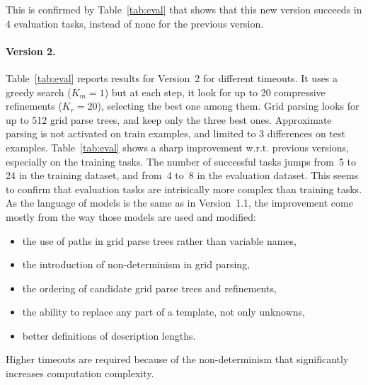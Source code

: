 \documentclass[a4paper]{llncs}
\begin{document}
This is confirmed by Table~\ref{tab:eval} that shows that this new
version succeeds in 4 evaluation tasks, instead of none for the
previous version.

\paragraph{Version 2.} Table~\ref{tab:eval} reports results for
Version~2 for different timeouts. It uses a greedy search ($K_m = 1$)
but at each step, it look for up to 20 compressive refinements
($K_r = 20$), selecting the best one among them. Grid parsing looks
for up to 512 grid parse trees, and keep only the three best
ones. Approximate parsing is not activated on train examples, and
limited to 3 differences on test examples.
%
Table~\ref{tab:eval} shows a sharp improvement w.r.t. previous
versions, especially on the training tasks. The number of successful
tasks jumps from~5 to 24 in the training dataset, and from~4 to~8 in
the evaluation dataset. This seems to confirm that evaluation tasks
are intrisically more complex than training tasks.
%
As the language of models is the same as in Version~1.1, the
improvement come mostly from the way those models are used and
modified:
\begin{itemize}
\item the use of paths in grid parse trees rather than variable names,
\item the introduction of non-determinism in grid parsing,
\item the ordering of candidate grid parse trees and refinements,
\item the ability to replace any part of a template, not only unknowns,
\item better definitions of description lengths.
\end{itemize}
Higher timeouts are required because of the non-determinism that
significantly increases computation complexity.
\end{document}
